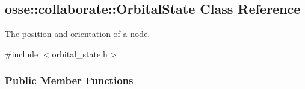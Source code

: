 \hypertarget{classosse_1_1collaborate_1_1_orbital_state}{}\subsection{osse\+:\+:collaborate\+:\+:Orbital\+State Class Reference}
\label{classosse_1_1collaborate_1_1_orbital_state}


The position and orientation of a node.  




{\ttfamily \#include $<$orbital\+\_\+state.\+h$>$}

\subsubsection*{Public Member Functions}
